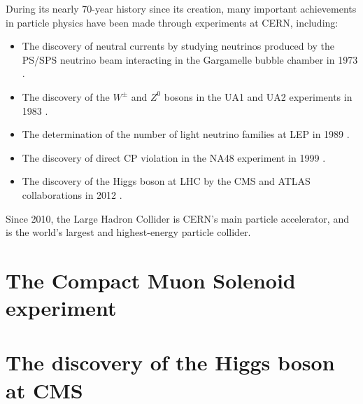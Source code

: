 During its nearly 70-year history since its creation, many important achievements in particle physics have been made through experiments at CERN, including:
\begin{itemize}
    \setlength\itemsep{0em}
    \item The discovery of neutral currents by studying neutrinos produced by the PS/SPS neutrino beam interacting in the Gargamelle bubble chamber in 1973 \cite{GargamelleNeutrino:1973jyy}.
    \item The discovery of the $W^\pm$ and $Z^0$ bosons in the UA1 and UA2 experiments in 1983 \cite{UA1:1983crd, UA2:1983tsx}.
    \item The determination of the number of light neutrino families at LEP in 1989 \cite{ALEPH:1989kcj}.
    \item The discovery of direct CP violation in the NA48 experiment in 1999 \cite{NA48:1999szy}.
    \item The discovery of the Higgs boson at LHC by the CMS and ATLAS collaborations in 2012 \cite{CMS:2012qbp,ATLAS:2012yve}.
\end{itemize}

Since 2010, the Large Hadron Collider is CERN's main particle accelerator, and is the world's largest and highest-energy particle collider.


\section{The Compact Muon Solenoid experiment}


\section{The discovery of the Higgs boson at CMS}



